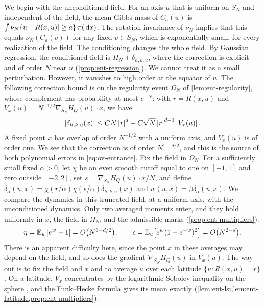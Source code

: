 We begin with the unconditioned field. For an axis $u$ that is uniform on $S_N$ and independent of the field, the mean Gibbs mass of $C_a(u)$ is $\int\nu_N\{u:\left|R(x,u)\right|\ge a\}\,\pi(\,\mathrm d x)$. The rotation invariance of $\nu_N$ implies that this equals $\nu_N(C_a(v))$ for any fixed $v\in S_N$, which is exponentially small, for every realization of the field. The conditioning changes the whole field. By Gaussian regression, the conditioned field is $H_N+\delta_{h,k,u}$, where the correction is explicit and of order $N$ near $u$ (\cref{prop:ent-regression}). We cannot treat it as a small perturbation. However, it vanishes to high order at the equator of $u$. The following correction bound is on the regularity event $\Omega_N$ of \cref{lem:ent-regularity}, whose complement has probability at most $e^{-N}$: with $r=R(x,u)$ and $V_x(u)=N^{-1/2}\nabla_{S_N}H_Q(u)\cdot x$, we have
\begin{equation}\label{eq:ov-correction}
\left|\delta_{h,k,u}(x)\right|\le CN\left|r\right|^d+C\sqrt N\left|r\right|^{d-1}\left|V_x(u)\right|.
\end{equation}
A fixed point $x$ has overlap of order $N^{-1/2}$ with a uniform axis, and $V_x(u)$ is of order one. We see that the correction is of order $N^{1-d/2}$, and this is the source of both polynomial errors in \eqref{eq:ov-entrance}. Fix the field in $\Omega_N$. For a sufficiently small fixed $\alpha>0$, let $\chi$ be an even smooth cutoff equal to one on $[-1,1]$ and zero outside $[-2,2]$, set $s=\nabla_{S_N}H_Q(u)\cdot x/N$, and define $\delta_\alpha(u,x)=\chi(r/\alpha)\chi(s/\alpha)\delta_{h,k,u}(x)$ and $w(u,x)=\beta\delta_\alpha(u,x)$. We compare the dynamics in this truncated field, at a uniform axis, with the unconditioned dynamics. Only two averaged moments enter, and they hold uniformly in $x$, the field in $\Omega_N$, and the admissible marks (\cref{prop:ent-multipliers}):
\begin{equation}\label{eq:ov-moments}
\eta=\mathbb E_u\left|e^w-1\right|=O\bigl(N^{1-d/2}\bigr),\qquad\epsilon=\mathbb E_u\bigl[e^w(1-e^{-w})^2\bigr]=O\bigl(N^{2-d}\bigr).
\end{equation}
There is an apparent difficulty here, since the point $x$ in these averages may depend on the field, and so does the gradient $\nabla_{S_N}H_Q(u)$ in $V_x(u)$. The way out is to fix the field and $x$ and to average $u$ over each latitude $\{u:R(x,u)=r\}$. On a latitude, $V_x$ concentrates by the logarithmic Sobolev inequality on the sphere \cite{BakryEmery1985}, and the Funk--Hecke formula \cite{AtkinsonHan2012} gives its mean exactly (\cref{lem:ent-lsi,lem:ent-latitude,prop:ent-multipliers}).

